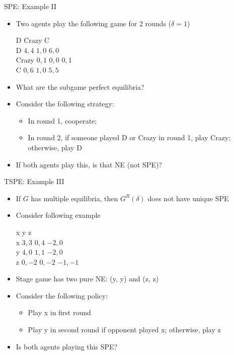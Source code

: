 \documentclass[11pt,aspectratio=169,handout]{beamer}
\begin{document}
  \begin{frame}{SPE: Example II}
   \begin{itemize}[<+->]
    \item Two agents play the following game for 2 rounds ($\delta = 1$)
    \begin{center}
     \hspace{-3.5em}
     \begin{game}{3}{3}
      		\> D			\> Crazy		\> C			\\
      D		\> $4, 4$	\> $1, 0$	\> $6, 0$	\\
      Crazy	\> $0, 1$	\> $0, 0$	\> $0, 1$	\\
      C		\> $0, 6$	\> $1, 0$	\> $5, 5$
     \end{game}
    \end{center}
    \vspace{0.7em}  
    \item What are the subgame perfect equilibria?
    \item Consider the following strategy:
    \begin{itemize}[<.->]
     \item In round 1, cooperate;
     \item In round 2, if someone played D or Crazy in round 1, play Crazy; otherwise, play D
    \end{itemize}
    \item If both agents play this, is that NE (not SPE)?
   \end{itemize}
  \end{frame} 
  
  
  \begin{frame}{TSPE: Example III}
   \begin{itemize}
    \item  If $G$ has multiple equilibria, then $G^{R}(\delta)$ does not have unique SPE
    \item Consider following example
    \begin{center}
     \hspace{-3.5em}
     \begin{game}{3}{3}
      	\> x			\> y			\> z			\\
      x	\> $3, 3$	\> $0, 4$	\> $-2, 0$	\\
      y	\> $4, 0$	\> $1, 1$	\> $-2, 0$	\\
      z	\> $0, -2$	\> $0, -2$	\> $-1, -1$
     \end{game}
    \end{center}
    \vspace{0.7em}
    \item Stage game has two pure NE: (y, y) and (z, z)
    \item Consider the following policy:
    \begin{itemize}
     \item Play x in first round
     \item Play y in second round if opponent played x; otherwise, play z
    \end{itemize}
    \item Is both agents playing this SPE?
   \end{itemize}  
  \end{frame}
\end{document}
